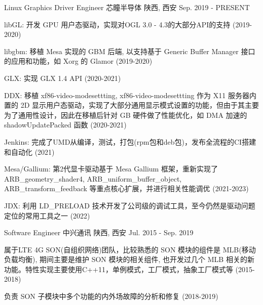 
\begin{cventries}
  \cventry
    {Linux Graphics Driver Engineer} %
    {芯瞳半导体} %
    {陕西, 西安} %
    {Sep. 2019 - PRESENT} %
    {
      \begin{cvitems} %
        \item {libGL: 开发 GPU 用户态驱动，实现对OGL 3.0 - 4.3的大部分API的支持 (2019-2020)}
        \item {libgbm: 移植 Mesa 实现的 GBM 后端, 以支持基于 Generic Buffer Manager 接口的应用和功能，如 Xorg 的 Glamor (2019-2020)}
        \item {GLX: 实现 GLX 1.4 API (2020-2021)}
        \item {DDX: 移植 xf86-video-modesettting, xf86-video-modesettting 作为 X11 服务器内置的 2D 显示用户态驱动，实现了大部分通用显示模式设置的功能，但由于其主要为了通用性设计，因此在移植后针对 GB 硬件做了性能优化，如 DMA 加速的 shadowUpdatePacked 函数 (2020-2021)}
        \item {Jenkins: 完成了UMD从编译，测试，打包(rpm包和deb包)，发布全流程的CI搭建和自动化 (2021)}
        \item {Mesa/Gallium: 第2代显卡驱动基于 Mesa Gallium 框架，重新实现了 ARB\_geometry\_shader4,  ARB\_uniform\_buffer\_object, ARB\_transform\_feedback 等重点核心扩展，并进行相关性能调优 (2021-2023)}
        \item {JDX: 利用 LD\_PRELOAD 技术开发了公司级的调试工具，至今仍然是驱动问题定位的常用工具之一 (2022)}
      \end{cvitems}
    }

  \cventry
    {Software Engineer} %
    {中兴通讯} %
    {陕西, 西安} %
    {Jul. 2015 - Sep. 2019} %
    {
      \begin{cvitems} %
      \item {属于LTE 4G SON(自组织网络)团队，比较熟悉的 SON 模块的组件是 MLB(移动负载均衡), 期间主要是维护 SON 模块的相关组件, 也开发过几个 MLB 相关的新功能。特性实现主要使用C++11，单例模式，工厂模式，抽象工厂模式等 (2015-2018)}
      \item {负责 SON 子模块中多个功能的内外场故障的分析和修复 (2018-2019)}
      \end{cvitems}
    }
\end{cventries}
